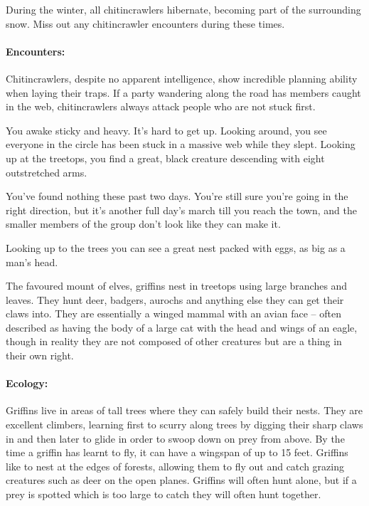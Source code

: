 \begin{multicols}{2}
During the winter, all chitincrawlers hibernate, becoming part of the surrounding snow.  Miss out any chitincrawler encounters during these times.

\paragraph{Encounters:} Chitincrawlers, despite no apparent intelligence, show incredible planning ability when laying their traps.  If a party wandering along the road has members caught in the web, chitincrawlers always attack people who are not stuck first.

\begin{boxtext}

You awake sticky and heavy.
It's hard to get up.
Looking around, you see everyone in the circle has been stuck in a massive web while they slept.
Looking up at the treetops, you find a great, black creature descending with eight outstretched arms.

\end{boxtext}

\label{griffin}

\begin{boxtext}

	You've found nothing these past two days.  You're still sure you're going in the right direction, but it's another full day's march till you reach the town, and the smaller members of the group don't look like they can make it.

	Looking up to the trees you can see a great nest packed with eggs, as big as a man's head.

\end{boxtext}

The favoured mount of elves, griffins nest in treetops using large branches and leaves.
They hunt deer, badgers, aurochs and anything else they can get their claws into.
They are essentially a winged mammal with an avian face -- often described as having the body of a large cat with the head and wings of an eagle, though in reality they are not composed of other creatures but are a thing in their own right.


\paragraph{Ecology:} Griffins live in areas of tall trees where they can safely build their nests.
They are excellent climbers, learning first to scurry along trees by digging their sharp claws in and then later to glide in order to swoop down on prey from above.
By the time a griffin has learnt to fly, it can have a wingspan of up to 15 feet.
Griffins like to nest at the edges of forests, allowing them to fly out and catch grazing creatures such as deer on the open planes.
Griffins will often hunt alone, but if a prey is spotted which is too large to catch  they will often hunt together.


\end{multicols}
